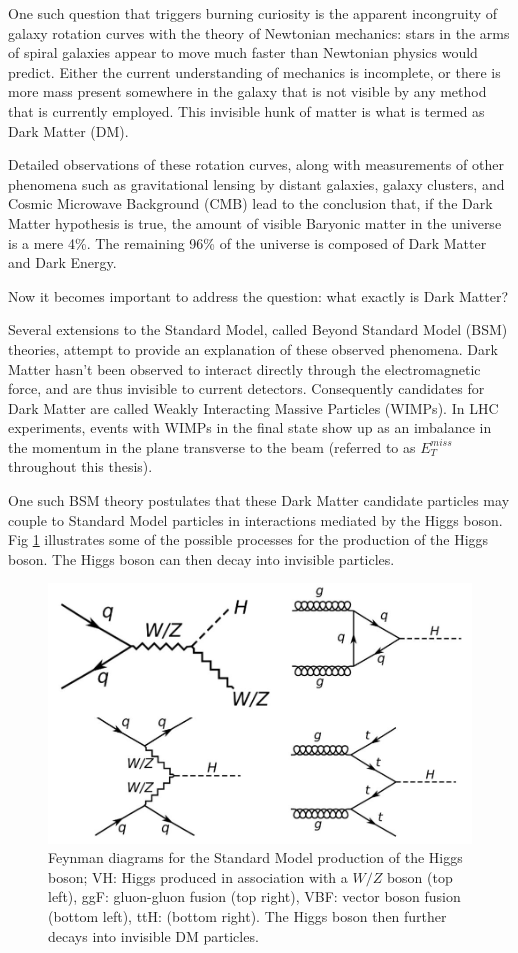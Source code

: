 \documentclass[11pt,a4paper,openright,twoside]{report}
\newcommand{\met}{$E_T^{miss}$ }
\begin{document}
One such question that triggers burning curiosity is the apparent incongruity of galaxy rotation curves with the theory of Newtonian mechanics: stars in the arms of spiral galaxies appear to move much faster than Newtonian physics would predict. Either the current understanding of mechanics is incomplete, or there is more mass present somewhere in the galaxy that is not visible by any method that is currently employed. This invisible hunk of matter is what is termed as Dark Matter (DM).

Detailed observations of these rotation curves, along with measurements of other phenomena such as gravitational lensing by distant galaxies, galaxy clusters, and Cosmic Microwave Background (CMB) lead to the conclusion that, if the Dark Matter hypothesis is true, the amount of visible Baryonic matter in the universe is a mere 4\%. The remaining 96\% of the universe is composed of Dark Matter and Dark Energy.

Now it becomes important to address the question: what exactly is Dark Matter? 

Several extensions to the Standard Model, called Beyond Standard Model (BSM) theories, attempt to provide an explanation of these observed phenomena. Dark Matter hasn't been observed to interact directly through the electromagnetic force, and are thus invisible to current detectors. Consequently candidates for Dark Matter are called Weakly Interacting Massive Particles (WIMPs). In LHC experiments, events with WIMPs in the final state show up as an imbalance in the momentum in the plane transverse to the beam (referred to as \met throughout this thesis).

One such BSM theory postulates that these Dark Matter candidate particles may couple to Standard Model particles in interactions mediated by the Higgs boson. Fig \ref{fig:higgs} illustrates some of the possible processes for the production of the Higgs boson. The Higgs boson can then decay into invisible particles.

\begin{figure}[H]
\centering
\includegraphics[width=0.5\linewidth]{higgs_production.png}
\caption{Feynman diagrams for the Standard Model production of the Higgs boson; VH: Higgs produced in association with a $W/Z$ boson (top left), ggF: gluon-gluon fusion (top right), VBF: vector boson fusion (bottom left), ttH: (bottom right). The Higgs boson then further decays into invisible DM particles.}
\label{fig:higgs}
\end{figure}
\end{document}
